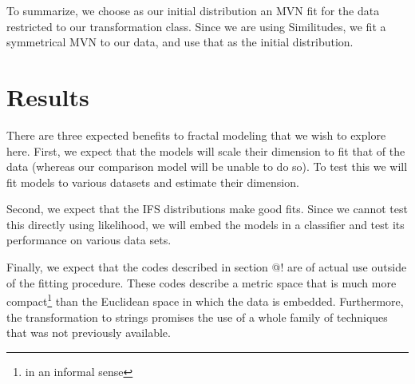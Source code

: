 \documentclass[10pt,a4paper,oneside]{article}
\theoremstyle{definition}
\begin{document}
To summarize, we choose as our initial distribution an MVN fit for the data restricted to our transformation class. Since we are using Similitudes, we fit a symmetrical MVN to our data, and use that as the initial distribution.






\section*{Results}

There are three expected benefits to fractal modeling that we wish to explore here. First, we expect that the models will scale their dimension to fit that of the data (whereas our comparison model will be unable to do so). To test this we will fit models to various datasets and estimate their dimension. 

Second, we expect that the IFS distributions make good fits. Since we cannot test this directly using likelihood, we will embed the models in a classifier and test its performance on various data sets.

Finally, we expect that the codes described in section @! are of actual use outside of the fitting procedure. These codes describe a metric space that is much more compact\footnote{in an informal sense} than the Euclidean space in which the data is embedded. Furthermore, the transformation to strings promises the use of a whole family of techniques that was not previously available.
\end{document}

